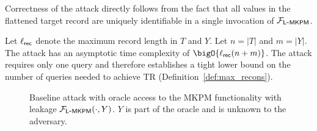 Correctness of the attack directly follows
from the fact that all values in the flattened target record are uniquely
identifiable in a single invocation of $\mathcal{F}_{\mathsf{L\mbox{-}MKPM}}$. 

Let $\ell_{\mathsf{rec}}$ denote the maximum record length in $T$ and $Y$. Let $n = |T|$ and $m = |Y|$.
The attack has an asymptotic time complexity of
$\bigO{\ell_{\rec}(n + m)}$.
The attack requires only one query and therefore establishes a tight lower bound on the number of queries needed to achieve TR (Definition~\ref{def:max_recons}).

\begin{figure}
	\centering
	\begin{pchstack}
		\pchspace
		\hspace{2mm}
	\end{pchstack}
	\caption{Baseline attack with oracle access to the MKPM functionality with leakage $\mathcal{F}_{\mathsf{L\mbox{-}MKPM}}(\cdot, Y)$. 
	$Y$ is part of the oracle and is unknown to the adversary.
	} \label{fig:toy_attack} \label{fig:dict_infer}
\end{figure}



